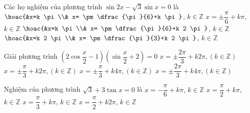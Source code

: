 \begin{ex}%
	Các  họ nghiệm của phương trình $\sin 2 x-\sqrt{3}\sin x=0$ là
	 \choice
		{$\hoac{&x=k \pi \\& x= \pm  \dfrac{\pi}{6}+k \pi}$, $k\in\mathbb{Z}$}
		{$x=  \pm \dfrac{\pi}{6}+k \pi$, $k\in\mathbb{Z}$}
		{\True $\hoac{&x=k \pi \\& x= \pm \dfrac{\pi}{6}+k  2 \pi}$, $k\in\mathbb{Z}$}
		{$\hoac{&x=k 2 \pi \\&  x= \pm \dfrac{\pi}{3}+k 2 \pi}$, $k\in\mathbb{Z}$}
\end{ex}

\begin{ex}%
	Giải  phương trình $\left(2\cos \dfrac{x}{2}-1\right)\left(\sin \dfrac{x}{2}+2\right)=0$
	\choice 
		{$x=\pm \dfrac{2\pi}{3}+k2\pi,  \left(k\in \mathbb{Z}\right)$}
		 {$x=\pm \dfrac{\pi}{3}+k2\pi, \left(k\in \mathbb{Z}\right)$}
		{$x=\pm \dfrac{\pi}{3}+k4\pi,  \left(k\in \mathbb{Z}\right)$}
		{\True $x=\pm  \dfrac{2\pi}{3}+k4\pi, \left(k\in \mathbb{Z}\right)$}
\end{ex}

\begin{ex}%
	Nghiệm của phương trình $\sqrt{3}+3  \tan x=0$ là
	\choice 
		{\True $x=-\dfrac{\pi}{6}+k \pi$,  $k \in \mathbb{Z}$}
		{$x=\dfrac{\pi}{2}+k \pi$, $k \in \mathbb{Z}$} 
		{$x=\dfrac{\pi}{3}+k \pi$, $k \in \mathbb{Z}$} 
		{$x=\dfrac{\pi}{2}+k 2 \pi$,  $k \in \mathbb{Z}$}
\end{ex}

